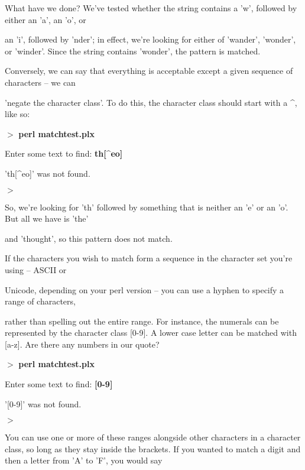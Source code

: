 \documentclass[a4paper,11pt]{book}
\begin{document}
\noindent 

\noindent What have we done? We've tested whether the string contains a 'w', followed by either an 'a', an 'o', or

\noindent an 'i', followed by 'nder'; in effect, we're looking for either of 'wander', 'wonder', or 'winder'. Since the string contains 'wonder', the pattern is matched.

\noindent 

\noindent Conversely, we can say that everything is acceptable except a given sequence of characters -- we can

\noindent 'negate the character class'. To do this, the character class should start with a \^{}, like so:

\noindent 

\noindent $>$ \textbf{perl matchtest.plx}

\noindent Enter some text to find: \textbf{th[\^{}eo]}

\noindent 'th[\^{}eo]' was not found.

\noindent $>$

\noindent 

\noindent So, we're looking for 'th' followed by something that is neither an 'e' or an 'o'. But all we have is 'the'

\noindent and 'thought', so this pattern does not match.

\noindent 

\noindent If the characters you wish to match form a sequence in the character set you're using -- ASCII or

\noindent Unicode, depending on your perl version -- you can use a hyphen to specify a range of characters,

\noindent rather than spelling out the entire range. For instance, the numerals can be represented by the character class [0-9]. A lower case letter can be matched with [a-z]. Are there any numbers in our quote?

\noindent 

\noindent $>$ \textbf{perl matchtest.plx}

\noindent Enter some text to find: \textbf{[0-9]}

\noindent '[0-9]' was not found.

\noindent $>$

\noindent 

\noindent You can use one or more of these ranges alongside other characters in a character class, so long as they stay inside the brackets. If you wanted to match a digit and then a letter from 'A' to 'F', you would say
\end{document}
